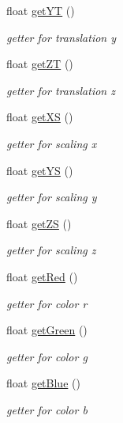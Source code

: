 \begin{DoxyCompactItemize}
float \hyperlink{classCuboid_a9512a37a653d63147a9a17ce26c90c7b}{get\-Y\-T} ()
\begin{DoxyCompactList}\small\item\em getter for translation y \end{DoxyCompactList}\item 
float \hyperlink{classCuboid_a27485c4e640edbf6b4503a7fbd29d858}{get\-Z\-T} ()
\begin{DoxyCompactList}\small\item\em getter for translation z \end{DoxyCompactList}\item 
float \hyperlink{classCuboid_aa43dc3e9a20ca492b650e5b6f10ed3a2}{get\-X\-S} ()
\begin{DoxyCompactList}\small\item\em getter for scaling x \end{DoxyCompactList}\item 
float \hyperlink{classCuboid_a98c8b126a24c6ecb37869ca86f094b9c}{get\-Y\-S} ()
\begin{DoxyCompactList}\small\item\em getter for scaling y \end{DoxyCompactList}\item 
float \hyperlink{classCuboid_ae10a417b52e689c7faafa751aa6a8738}{get\-Z\-S} ()
\begin{DoxyCompactList}\small\item\em getter for scaling z \end{DoxyCompactList}\item 
float \hyperlink{classCuboid_a99d6da21d1d9219d124521058697db0a}{get\-Red} ()
\begin{DoxyCompactList}\small\item\em getter for color r \end{DoxyCompactList}\item 
float \hyperlink{classCuboid_a855fb0b28ab85730fa219a219d90d873}{get\-Green} ()
\begin{DoxyCompactList}\small\item\em getter for color g \end{DoxyCompactList}\item 
float \hyperlink{classCuboid_a09d09f8ea0f95f8c186299440bb6d071}{get\-Blue} ()
\begin{DoxyCompactList}\small\item\em getter for color b \end{DoxyCompactList}\end{DoxyCompactItemize}
